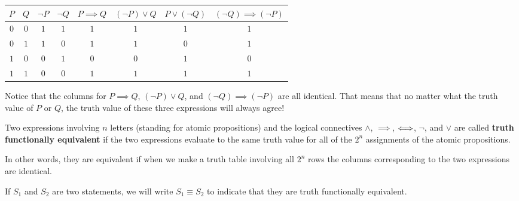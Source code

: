 \begin{solutions}
	
	\begin{table}[h!]
		\begin{center}
			\begin{tabular}{c|c|c|c|c|c|c|c} 
				$P$ & $Q$ & $\neg P$ & $\neg Q$  & $P \implies Q$ & $(\neg P) \vee Q$ &  $P \vee (\neg Q)$ & $(\neg Q) \implies (\neg P)$ \\
				\hline
				$0$& $0$ & $1$ & $1$ & $1$ & $1$ & $1$  &  $1$  \\ \hline
				$0$& $1$ & $1$ & $0$ & $1$ & $1$ & $0$  &  $1$  \\ \hline
				$1$& $0$ & $0$ & $1$ & $0$ & $0$ & $1$  &  $0$   \\ \hline
				$1$& $1$ & $0$ & $0$ & $1$ & $1$ & $1$ &  $1$    \\ 
			\end{tabular}
		\end{center}
	\end{table}
\end{solutions}

Notice that the columns for $P \implies Q$,  $(\neg P) \vee Q$, and $(\neg Q) \implies (\neg P)$ are all identical.  That means that no matter what the truth value of $P$ or $Q$, the truth value of these three expressions will always agree! 

\begin{definition}
	Two expressions involving $n$ letters (standing for atomic propositions) and the logical connectives $\wedge$, $\implies$, $\Longleftrightarrow$, $\neg$, and $\vee$ are called \textbf{truth functionally equivalent} if the two expressions evaluate to the same truth value for all of the $2^n$ assignments of the atomic propositions.
	
	In other words, they are equivalent if when we make a truth table involving all $2^n$ rows the columns corresponding to the two expressions are identical.
	
	If $S_1$ and $S_2$ are two statements, we will write $S_1 \equiv S_2$ to indicate that they are truth functionally equivalent.
\end{definition}


